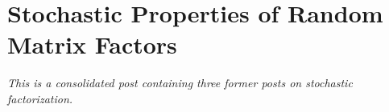 \section{Stochastic Properties of Random Matrix Factors}

\emph{This is a consolidated post containing three former posts on stochastic factorization.}




